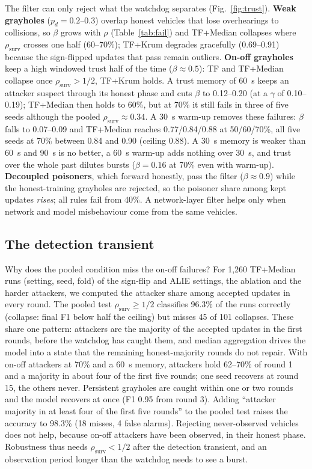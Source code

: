 \documentclass[conference]{IEEEtran}
\newcommand{\rsurv}{\rho_{\mathrm{surv}}}
\begin{document}
The filter can only reject what the watchdog separates (Fig.~\ref{fig:trust}). \textbf{Weak grayholes}
($p_d = 0.2$--0.3) overlap honest vehicles that lose overhearings to collisions, so $\beta$ grows with $\rho$
(Table~\ref{tab:fail}) and TF+Median collapses where $\rsurv$ crosses one half (60--70\%); TF+Krum degrades gracefully
(0.69--0.91) because the sign-flipped updates that pass remain outliers. \textbf{On-off grayholes} keep a high windowed
trust half of the time ($\beta \approx 0.5$): TF and TF+Median collapse once $\rsurv > 1/2$, TF+Krum holds. A trust
memory of 60~s keeps an attacker suspect through its honest phase and cuts $\beta$ to 0.12--0.20 (at a $\gamma$ of
0.10--0.19); TF+Median then holds to 60\%, but at 70\% it still fails in three of five seeds although the pooled
$\rsurv \approx 0.34$. A 30~s warm-up removes these failures: $\beta$ falls to 0.07--0.09 and TF+Median reaches
0.77/0.84/0.88 at 50/60/70\%, all five seeds at 70\% between 0.84 and 0.90 (ceiling 0.88). A 30~s memory is weaker
than 60~s and 90~s is no better, a 60~s warm-up adds nothing over 30~s, and trust over the whole past dilutes bursts
($\beta = 0.16$ at 70\% even with warm-up).
\textbf{Decoupled poisoners}, which forward honestly, pass the filter ($\beta \approx 0.9$) while the honest-training
grayholes are rejected, so the poisoner share among kept updates \emph{rises}; all rules fail from 40\%. A
network-layer filter helps only when network and model misbehaviour come from the same vehicles.

\subsection{The detection transient}
\label{sec:perround}

Why does the pooled condition miss the on-off failures? For 1{,}260 TF+Median runs (setting, seed, fold) of the
sign-flip and ALIE settings, the ablation and the harder attackers, we computed the attacker share among accepted updates in every round. The pooled test $\rsurv \ge 1/2$ classifies 96.3\%
of the runs correctly (collapse: final F1 below half the ceiling) but misses 45 of 101 collapses. These share one
pattern: attackers are the majority of the accepted updates in the first rounds, before the watchdog has caught them,
and median aggregation drives the model into a state that the remaining honest-majority rounds do not repair. With
on-off attackers at 70\% and a 60~s memory, attackers hold 62--70\% of round 1 and a majority in about four of the
first five rounds; one seed recovers at round 15, the others never. Persistent grayholes are caught within one or two
rounds and the model recovers at once (F1 0.95 from round 3). Adding ``attacker majority in at least four of the first
five rounds'' to the pooled test raises the accuracy to 98.3\% (18 misses, 4 false alarms). Rejecting never-observed
vehicles does not help, because on-off attackers have been observed, in their honest phase. Robustness thus needs
$\rsurv < 1/2$ after the detection transient, and an observation period longer than the watchdog needs to see a burst.
\end{document}
